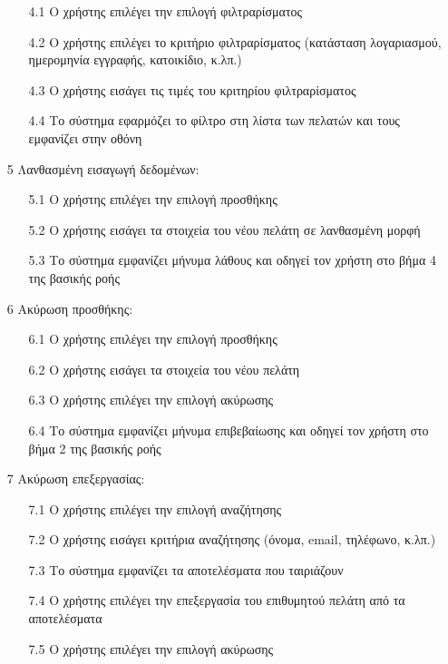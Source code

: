 \documentclass[12pt,a4paper,twoside]{book}
\begin{document}
\begin{enumerate}
    \begin{enumerate}
        \item [4.1 ] Ο χρήστης επιλέγει την επιλογή φιλτραρίσματος
        \item [4.2 ] Ο χρήστης επιλέγει το κριτήριο φιλτραρίσματος (κατάσταση λογαριασμού, ημερομηνία εγγραφής, κατοικίδιο, κ.λπ.)
        \item [4.3 ] Ο χρήστης εισάγει τις τιμές του κριτηρίου φιλτραρίσματος
        \item [4.4 ] Το σύστημα εφαρμόζει το φίλτρο στη λίστα των πελατών και τους εμφανίζει στην οθόνη
    \end{enumerate}
  \item[5 ] Λανθασμένη εισαγωγή δεδομένων:
    \begin{enumerate}
        \item [5.1 ] Ο χρήστης επιλέγει την επιλογή προσθήκης
        \item [5.2 ] Ο χρήστης εισάγει τα στοιχεία του νέου πελάτη σε λανθασμένη μορφή
        \item [5.3 ] Το σύστημα εμφανίζει μήνυμα λάθους και οδηγεί τον χρήστη στο βήμα 4 της βασικής ροής
    \end{enumerate}
  \item[6 ] Ακύρωση προσθήκης:
    \begin{enumerate}
        \item [6.1 ] Ο χρήστης επιλέγει την επιλογή προσθήκης
        \item [6.2 ] Ο χρήστης εισάγει τα στοιχεία του νέου πελάτη
        \item [6.3 ] Ο χρήστης επιλέγει την επιλογή ακύρωσης
        \item [6.4 ] Το σύστημα εμφανίζει μήνυμα επιβεβαίωσης και οδηγεί τον χρήστη στο βήμα 2 της βασικής ροής
    \end{enumerate}
  \item[7 ] Ακύρωση επεξεργασίας:
    \begin{enumerate}
        \item [7.1 ] Ο χρήστης επιλέγει την επιλογή αναζήτησης
        \item [7.2 ] Ο χρήστης εισάγει κριτήρια αναζήτησης (όνομα, email, τηλέφωνο, κ.λπ.)
        \item [7.3 ] Το σύστημα εμφανίζει τα αποτελέσματα που ταιριάζουν
        \item [7.4 ] Ο χρήστης επιλέγει την επεξεργασία του επιθυμητού πελάτη από τα αποτελέσματα
        \item [7.5 ] Ο χρήστης επιλέγει την επιλογή ακύρωσης

\end{enumerate}
\end{enumerate}
\end{document}

